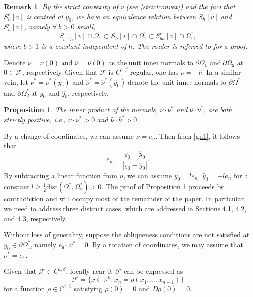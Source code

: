 \documentclass[11pt]{amsart}
\theoremstyle{plain}
\newtheorem{proposition}{Proposition}[section]
\newtheorem{remark}{Remark}[section]
\newcommand{\0}{\textbf{0}}
\numberwithin{equation}{section}
\numberwithin{equation}{section}
\numberwithin{figure}{section}
\begin{document}
\begin{remark}\label{reeq1}
\emph{ By the strict convexity of $v$ (see \eqref{strictconvex}) and the fact that $S^c_h[v]$ is centred at $y_0$,
we have an equivalence relation between $S_h[v]$ and $S^c_{h}[v]$, namely $\forall\,h>0$ small, 
\begin{equation}\label{equi0}
S^c_{b^{-1}h}[v] \cap \Omega_1^*\subset S_h[v] \cap \Omega_1^* \subset S^c_{bh}[v] \cap \Omega_1^*,
\end{equation}
where \( b>1 \) is a constant independent of \( h \). 
The reader is referred to \cite[Lemma 2.2]{CLW1} for a proof. }
\end{remark}




Denote \( \nu = \nu(0) \) and \( \hat\nu = \hat\nu(0) \) as the unit inner normals to \( \partial\Omega_1 \) and \( \partial\Omega_2 \) at \( 0\in\mathcal{F} \), respectively. 
Given that \( \mathcal{F} \) is  \( C^{1,\beta} \) regular, one has \( \nu = -\hat\nu \).
In a similar vein, let \( \nu^* = \nu^*(y_0) \) and \( \hat\nu^* = \hat\nu^*(\hat y_0) \) denote the unit inner normals to \( \partial\Omega^*_1 \) and \( \partial\Omega^*_2 \) at \( y_0 \) and \( \hat y_0 \), respectively.

\begin{proposition}\label{oblique2}
The inner product of the normals, \( \nu \cdot \nu^* \) and \( \hat\nu \cdot \hat\nu^* \), are both strictly positive, i.e., \( \nu \cdot \nu^* > 0 \) and \( \hat\nu \cdot \hat\nu^* > 0 \).
\end{proposition}

By a change of coordinates, we can assume $\nu=e_n$. Then from \eqref{gn1}, it follows that 
	\[ e_n = \frac{y_0 - \hat y_0}{|y_0 - \hat y_0|}. \]
By subtracting a linear function from $u$, we can assume \( y_0 = l e_n \), \( \hat y_0 = -l e_n \) for a constant \( l \geq \frac{1}{2}\text{dist}(\Omega_1^*, \Omega_2^*)>0 \).
The proof of Proposition \ref{oblique2} proceeds by contradiction and will occupy most of the remainder of the paper. In particular, we need to address three distinct cases, which are addressed in Sections 4.1, 4.2, and 4.3, respectively.  

Without loss of generality, suppose the obliqueness conditions are not satisfied at $y_0\in \partial\Omega^*_1$, namely $e_n\cdot \nu^*=0$.
By a rotation of coordinates, we may assume that \( \nu^* = e_1 \).



Given that \( \mathcal{F} \in C^{1,\beta} \), locally near $0$, \( \mathcal{F} \) can be expressed as 
\begin{equation}\label{calf1}
 \mathcal{F} = \{x\in\mathbb{R}^n : x_n = \rho(x_1, \ldots, x_{n-1})\}
 \end{equation}
for a function \( \rho \in C^{1,\beta} \) satisfying $\rho(0)=0$ and $D\rho(0)=0$. 
\end{document}
